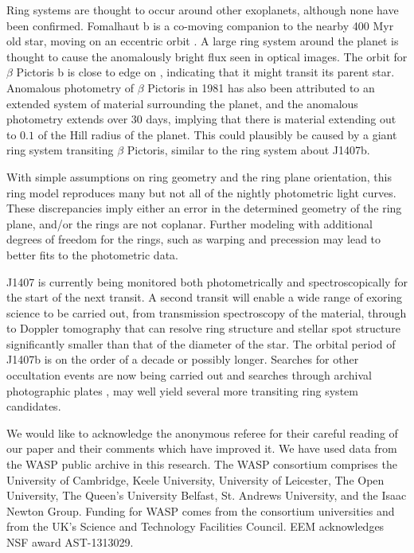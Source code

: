 \documentclass{emulateapj}
\begin{document}
Ring systems are thought to occur around other exoplanets, although none
have been confirmed.
Fomalhaut b is a co-moving companion to the nearby 400 Myr old star,
moving on an eccentric orbit \citep{Kalas13,Mamajek12b}.
A large ring system around the planet is thought to cause the
anomalously bright flux seen in optical images.
The orbit for $\beta$ Pictoris b is close to edge on \citep{Nielsen14},
indicating that it might transit its parent star.
Anomalous photometry of $\beta$ Pictoris in 1981
\citep{LecavelierdesEtangs95} has also been attributed to an extended
system of material surrounding the planet, and the anomalous photometry
extends over 30 days, implying that there is material extending out to
$0.1$ of the Hill radius of the planet.
This could plausibly be caused by a giant ring system transiting $\beta$
Pictoris, similar to the ring system about J1407b.

With simple assumptions on ring geometry and the ring plane orientation,
this ring model reproduces many but not all of the nightly photometric light curves.
These discrepancies imply either an error in the determined geometry of
the ring plane, and/or the rings are not coplanar.
Further modeling with additional degrees of freedom for the rings, such
as warping and precession may lead to better fits to the photometric
data.

J1407 is currently being monitored both photometrically and
spectroscopically for the start of the next transit.
A second transit will enable a wide range of exoring science to be
carried out, from transmission spectroscopy of the material, through to
Doppler tomography that can resolve ring structure and stellar spot
structure significantly smaller than that of the diameter of the star.
The orbital period of J1407b is on the order of a decade or possibly
longer.
Searches for other occultation events are now being carried out
\citep{Quillen14} and searches through archival photographic plates
\citep[e.g. DASCH;][]{Grindlay12}, may well yield several more
transiting ring system candidates.

\acknowledgments

We would like to acknowledge the anonymous referee for their careful
reading of our paper and their comments which have improved it.
We have used data from the WASP public archive in this research. The
WASP consortium comprises the University of Cambridge, Keele University,
University of Leicester, The Open University, The Queen's University
Belfast, St. Andrews University, and the Isaac Newton Group. Funding for
WASP comes from the consortium universities and from the UK's Science
and Technology Facilities Council.
EEM acknowledges NSF award AST-1313029.
\end{document}
